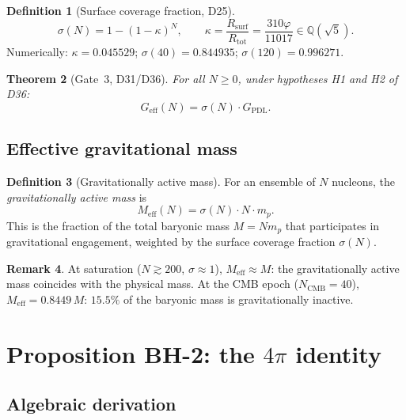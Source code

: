\documentclass[11pt,a4paper]{article}
\newtheorem{theorem}{Theorem}[section]
\theoremstyle{definition}
\newtheorem{definition}[theorem]{Definition}
\newtheorem{remark}[theorem]{Remark}
\newcommand{\Rtot}{R_{\mathrm{tot}}}
\newcommand{\Rsurf}{R_{\mathrm{surf}}}
\newcommand{\vp}{\varphi}
\newcommand{\kap}{\kappa}
\newcommand{\sig}{\sigma}
\newcommand{\GPDL}{G_{\mathrm{PDL}}}
\newcommand{\Geff}{G_{\mathrm{eff}}}
\newcommand{\Meff}{M_{\mathrm{eff}}}
\begin{document}
\begin{definition}[Surface coverage fraction, D25]
\label{def:sigma}
\begin{equation}
\sig(N) = 1-(1-\kap)^N,
\qquad
\kap = \frac{\Rsurf}{\Rtot} = \frac{310\vp}{11017} \in \mathbb{Q}(\sqrt{5}).
\label{eq:sigma}
\end{equation}
Numerically: $\kap = 0.045529$; $\sig(40) = 0.844935$; $\sig(120) = 0.996271$.
\end{definition}

\begin{theorem}[Gate~3, D31/D36]
\label{thm:gate3}
For all $N \geq 0$, under hypotheses H1 and H2 of D36:
\begin{equation}
\Geff(N) = \sig(N)\cdot\GPDL.
\label{eq:gate3}
\end{equation}
\end{theorem}

\subsection{Effective gravitational mass}

\begin{definition}[Gravitationally active mass]
\label{def:Meff}
For an ensemble of $N$ nucleons, the \emph{gravitationally active mass} is
\begin{equation}
\Meff(N) = \sig(N)\cdot N\cdot m_p.
\label{eq:Meff}
\end{equation}
This is the fraction of the total baryonic mass $M = N m_p$ that participates
in gravitational engagement, weighted by the surface coverage fraction $\sig(N)$.
\end{definition}

\begin{remark}
At saturation ($N \gtrsim 200$, $\sig \approx 1$), $\Meff \approx M$: the
gravitationally active mass coincides with the physical mass. At the CMB epoch
($N_\mathrm{CMB} = 40$), $\Meff = 0.8449\,M$: $15.5\%$ of the baryonic mass
is gravitationally inactive.
\end{remark}

\section{Proposition BH-2: the \texorpdfstring{$4\pi$}{4pi} identity}
\label{sec:BH2}

\subsection{Algebraic derivation}
\end{document}

